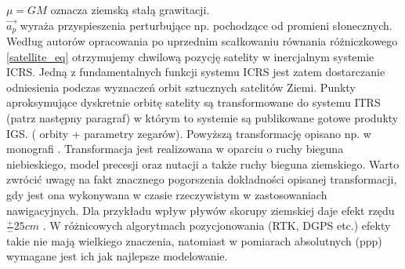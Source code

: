 $\mu = GM $ oznacza ziemską stałą grawitacji.\\
$\vec{a_p}$ wyraża przyspieszenia perturbujące np. pochodzące od promieni słonecznych.
Według autorów opracowania \cite[]{BRZEZINSKI_2012} po uprzednim scałkowaniu równania różniczkowego \ref{satellite_eq}
otrzymujemy chwilową pozycję satelity w inercjalnym systemie ICRS. Jedną z fundamentalnych funkcji systemu ICRS 
jest zatem dostarczanie odniesienia podczas wyznaczeń orbit sztucznych satelitów Ziemi. Punkty aproksymujące dyskretnie orbitę satelity 
są transformowane do systemu ITRS (patrz następny paragraf) w którym to systemie są publikowane gotowe produkty IGS. ( orbity + parametry zegarów).
Powyższą transformację opisano np. w monografi \cite[][strona 43]{IERS_2010}. Transformacja jest realizowana w oparciu o ruchy bieguna niebieskiego,
model precesji oraz nutacji a także ruchy bieguna ziemskiego. Warto zwrócić uwagę na fakt znacznego pogorszenia dokładności opisanej transformacji,
gdy jest ona wykonywana w czasie rzeczywistym w zastosowaniach nawigacyjnych. Dla przykładu wpływ pływów skorupy ziemskiej daje efekt rzędu 
$\frac{+}{-}25 cm$ \cite[][strona 166]{BRZEZINSKI_2012}. W różnicowych algorytmach pozycjonowania (RTK, DGPS etc.) 
efekty takie nie mają wielkiego znaczenia, natomiast w pomiarach absolutnych (ppp) wymagane jest ich jak najlepsze modelowanie.
